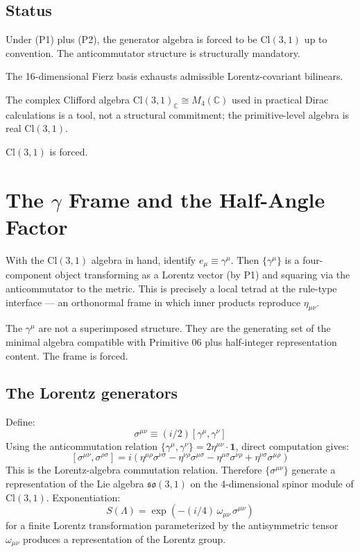\documentclass[11pt,a4paper]{article}
\begin{document}
\subsection{Status}

Under (P1) plus (P2), the generator algebra is forced to be $\mathrm{Cl}(3,1)$ up to convention. The anticommutator structure is structurally mandatory.

The 16-dimensional Fierz basis exhausts admissible Lorentz-covariant bilinears.

The complex Clifford algebra $\mathrm{Cl}(3,1)_\mathbb{C} \cong M_4(\mathbb{C})$ used in practical Dirac calculations is a tool, not a structural commitment; the primitive-level algebra is real $\mathrm{Cl}(3,1)$.

$\mathrm{Cl}(3,1)$ is forced.

\section{The $\gamma$ Frame and the Half-Angle Factor}

With the $\mathrm{Cl}(3,1)$ algebra in hand, identify $e_\mu \equiv \gamma^\mu$. Then $\{\gamma^\mu\}$ is a four-component object transforming as a Lorentz vector (by P1) and squaring via the anticommutator to the metric. This is precisely a local tetrad at the rule-type interface --- an orthonormal frame in which inner products reproduce $\eta_{\mu\nu}$.

The $\gamma^\mu$ are not a superimposed structure. They are the generating set of the minimal algebra compatible with Primitive 06 plus half-integer representation content. The frame is forced.

\subsection{The Lorentz generators}

Define:
\[
\sigma^{\mu\nu} \equiv (i/2)[\gamma^\mu, \gamma^\nu]
\]
Using the anticommutation relation $\{\gamma^\mu, \gamma^\nu\} = 2\eta^{\mu\nu}\cdot\mathbf{1}$, direct computation gives:
\[
[\sigma^{\mu\nu}, \sigma^{\rho\sigma}] = i(\eta^{\mu\rho}\sigma^{\nu\sigma} - \eta^{\nu\rho}\sigma^{\mu\sigma} - \eta^{\mu\sigma}\sigma^{\nu\rho} + \eta^{\nu\sigma}\sigma^{\mu\rho})
\]
This is the Lorentz-algebra commutation relation. Therefore $\{\sigma^{\mu\nu}\}$ generate a representation of the Lie algebra $\mathfrak{so}(3,1)$ on the 4-dimensional spinor module of $\mathrm{Cl}(3,1)$. Exponentiation:
\[
S(\Lambda) = \exp\!\left(-(i/4)\, \omega_{\mu\nu}\, \sigma^{\mu\nu}\right)
\]
for a finite Lorentz transformation parameterized by the antisymmetric tensor $\omega_{\mu\nu}$ produces a representation of the Lorentz group.
\end{document}
